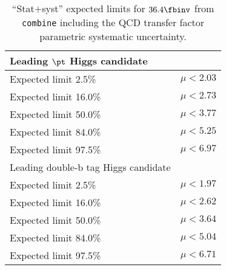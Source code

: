 \begin{table}[htbp]
\centering
\begin{tabular}{l|l}
\hline
Leading $\pt$ Higgs candidate& \\
\hline
 Expected limit 2.5\% & $\mu<2.03$\\
 Expected limit 16.0\% & $\mu<2.73$\\
 Expected limit 50.0\% & $\mu<3.77$\\
 Expected limit 84.0\% & $\mu<5.25$\\
 Expected limit 97.5\% & $\mu<6.97$\\
\hline
Leading double-b tag Higgs candidate& \\
\hline
 Expected limit 2.5\% & $\mu<1.97$\\
 Expected limit 16.0\% & $\mu<2.62$\\
 Expected limit 50.0\% & $\mu<3.64$\\
 Expected limit 84.0\% & $\mu<5.04$\\
 Expected limit 97.5\% & $\mu<6.71$\\
\hline
\end{tabular}
\caption{``Stat$+$syst'' expected limits for $36.4\fbinv$ from \texttt{combine} including the QCD transfer factor parametric systematic uncertainty.
\label{tab:expectedLimits_higgscand}}
\end{table}

